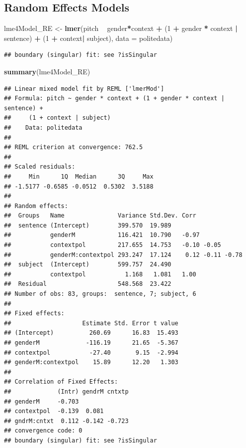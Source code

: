 \documentclass[]{book}
\newenvironment{Shaded}{\begin{snugshade}}{\end{snugshade}}
\newcommand{\DataTypeTok}[1]{\textcolor[rgb]{0.13,0.29,0.53}{#1}}
\newcommand{\DecValTok}[1]{\textcolor[rgb]{0.00,0.00,0.81}{#1}}
\newcommand{\KeywordTok}[1]{\textcolor[rgb]{0.13,0.29,0.53}{\textbf{#1}}}
\newcommand{\NormalTok}[1]{#1}
\newcommand{\OperatorTok}[1]{\textcolor[rgb]{0.81,0.36,0.00}{\textbf{#1}}}
\newcommand{\StringTok}[1]{\textcolor[rgb]{0.31,0.60,0.02}{#1}}
\begin{document}
\hypertarget{random-effects-models}{%
\subsection{Random Effects Models}\label{random-effects-models}}

\begin{Shaded}
\begin{Highlighting}[]
\NormalTok{lme4Model_RE <-}\StringTok{ }\KeywordTok{lmer}\NormalTok{(pitch }\OperatorTok{~}\StringTok{ }\NormalTok{gender}\OperatorTok{*}\NormalTok{context }\OperatorTok{+}\StringTok{ }
\StringTok{                       }\NormalTok{(}\DecValTok{1} \OperatorTok{+}\StringTok{ }\NormalTok{gender }\OperatorTok{*}\StringTok{ }\NormalTok{context }\OperatorTok{|}\StringTok{ }\NormalTok{sentence) }\OperatorTok{+}\StringTok{ }
\StringTok{                       }\NormalTok{(}\DecValTok{1} \OperatorTok{+}\StringTok{ }\NormalTok{context}\OperatorTok{|}\StringTok{ }\NormalTok{subject), }
                     \DataTypeTok{data =}\NormalTok{ politedata)}
\end{Highlighting}
\end{Shaded}

\begin{verbatim}
## boundary (singular) fit: see ?isSingular
\end{verbatim}

\begin{Shaded}
\begin{Highlighting}[]
\KeywordTok{summary}\NormalTok{(lme4Model_RE)}
\end{Highlighting}
\end{Shaded}

\begin{verbatim}
## Linear mixed model fit by REML ['lmerMod']
## Formula: pitch ~ gender * context + (1 + gender * context | sentence) +  
##     (1 + context | subject)
##    Data: politedata
## 
## REML criterion at convergence: 762.5
## 
## Scaled residuals: 
##     Min      1Q  Median      3Q     Max 
## -1.5177 -0.6585 -0.0512  0.5302  3.5188 
## 
## Random effects:
##  Groups   Name               Variance Std.Dev. Corr             
##  sentence (Intercept)        399.570  19.989                    
##           genderM            116.421  10.790   -0.97            
##           contextpol         217.655  14.753   -0.10 -0.05      
##           genderM:contextpol 293.247  17.124    0.12 -0.11 -0.78
##  subject  (Intercept)        599.757  24.490                    
##           contextpol           1.168   1.081   1.00             
##  Residual                    548.568  23.422                    
## Number of obs: 83, groups:  sentence, 7; subject, 6
## 
## Fixed effects:
##                    Estimate Std. Error t value
## (Intercept)          260.69      16.83  15.493
## genderM             -116.19      21.65  -5.367
## contextpol           -27.40       9.15  -2.994
## genderM:contextpol    15.89      12.20   1.303
## 
## Correlation of Fixed Effects:
##             (Intr) gendrM cntxtp
## genderM     -0.703              
## contextpol  -0.139  0.081       
## gndrM:cntxt  0.112 -0.142 -0.723
## convergence code: 0
## boundary (singular) fit: see ?isSingular
\end{verbatim}
\end{document}
